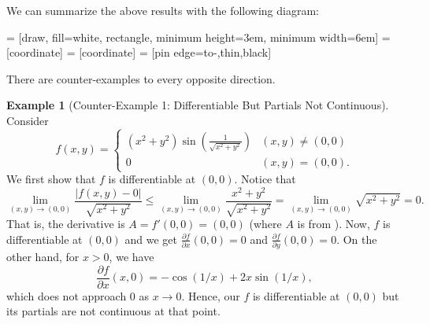 \documentclass[letterpaper,12pt]{article}
\theoremstyle{definition}
\newtheorem{example}{Example}[section]
\theoremstyle{plain}
\theoremstyle{remark}
\begin{document}
We can summarize the above results with the following diagram:

 = [draw, fill=white, rectangle, 
    minimum height=3em, minimum width=6em]
 = [coordinate]
 = [coordinate]
 = [pin edge={to-,thin,black}]


There are counter-examples to every opposite direction.

\begin{example}[Counter-Example 1: Differentiable But Partials Not Continuous] \hfill

Consider 
\[f(x,y) = \begin{cases}
(x^2+y^2)\sin \left(\frac{1}{\sqrt{x^2+y^2}}\right) & (x,y)\neq(0,0) \\
0 & (x,y) = (0,0).
\end{cases}\]
We first show that $f$ is differentiable at $(0,0)$. Notice that
\[\lim_{(x,y)\to (0,0)}\frac{|f(x,y)-0|}{\sqrt{x^2+y^2}} \leq \lim_{(x,y)\to (0,0)} \frac{x^2+y^2}{\sqrt{x^2+y^2}} = \lim_{(x,y)\to (0,0)} \sqrt{x^2+y^2} = 0.\]
That is, the derivative is $A = f'(0,0) = (0,0)$ (where $A$ is from ). Now, $f$ is differentiable at $(0,0)$ and we get $\frac{\partial f}{\partial x}(0,0) = 0$ and $\frac{\partial f}{\partial y}(0,0) = 0$. On the other hand, for $x>0$, we have
\[\frac{\partial f}{\partial x}(x,0) = -\cos(1/x)+2x\sin(1/x),\]
which does not approach $0$ as $x\to 0$. Hence, our $f$ is differentiable at $(0,0)$ but its partials are not continuous at that point.
\end{example}
\end{document}
